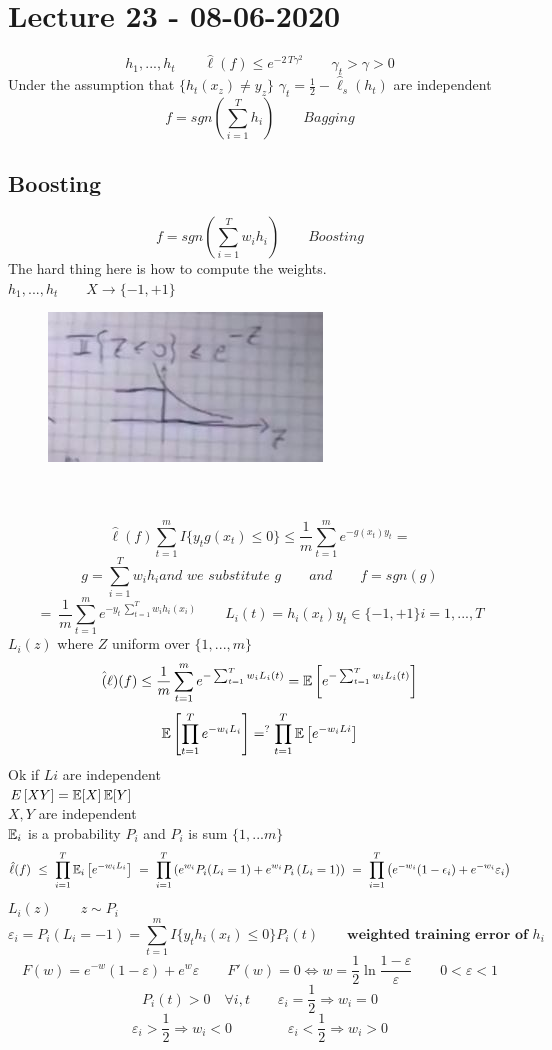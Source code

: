 \documentclass[../main.tex]{subfiles}
\begin{document}
\chapter{Lecture 23 - 08-06-2020}
$$
h_1,...,h_t \qquad \hat{\ell}(f) \leq e^{-2 \, T \gamma^2} \qquad \gamma_t > \gamma>0
$$
Under the assumption that $ \{ h_t(x_z) \neq y_z \} $ \qquad $ \gamma_t = \frac{1}{2} - \hat{\ell}_s(h_t)$ are independent 
$$
f = sgn ( \sum_{i=1}^T h_i) \qquad Bagging
$$
\section{Boosting}
$$
f = sgn ( \sum_{i=1}^T w_i h_i) \qquad Boosting
$$
The hard thing here is how to compute the weights.
\\
$
h_1, ..., h_t \qquad X \rightarrow \{ -1,+1 \} 
$
\begin{figure}[h]
    \centering
    \includegraphics[width=0.3\linewidth]{../img/lez23-img1.JPG}
    \caption{}
\end{figure}\\
\\
$$
\hat{\ell}(f)\sum^m_{t=1} I \{ y_t g(x_t) \leq 0 \}
\leq
\frac{1}{m} \sum_{t=1}^m e^{-g(x_t) y_t
} = $$
$$
g = \sum_{i = 1}^T w_i h_i \textit{and we substitute g} \qquad and \qquad f = sgn(g)
$$
$$
= \ \frac{1}{m} \sum^m_{t=1} e^{-y_t \, \sum_{t=1}^T w_i h_i(x_i)} \qquad L_i(t) = h_i (x_t) y_t \in \{-1,+1 \} i = 1, ..., T
$$
$
L_i(z) 
$ where $Z$ uniform over $\{1,...,m\}$
$$
\hat(\ell)(f) \leq \frac{1}{m} \sum_{t=1}^m e^{- \sum_{t=1}^T w_i L_i (t)} = \mathbb{E} \left[ e^{-\sum_{t=1}^T w_i L_i (t)}\right] 
$$
$$
\mathbb{E} \left[ \prod_{t=1}^T e^{- w_i L_i}\right] =^? \prod^T_{t=1} \mathbb{E} \left[ e^{-w_i Li} \right]
$$
Ok if $Li$ are independent
\\$E\left[XY \right] = \mathbb{E}[X] \, \mathbb{E} [Y]$ 
\\
$X,Y$ are independent
\\
$\mathbb{E}_i $ is a probability $P_i$ and $P_i$ is sum $\{1,...m\}$
\\
$$
\hat{\ell}(f)\ \leq \ \prod_{i=1}^T \mathbb{E}_i \left[ e^{- w_i L_i} \right]
\ = \ \prod_{i=1}^T \left( e^{w_i} P_i (L_i = 1) + e^{w_i} P_i\left(L_i=1  \right) \right) \ = \ \prod_{i=1}^T \left( e^{-w_i}(1 - \epsilon_i) + e^{-w_i} \varepsilon_i \right)$$
$ L_i(z) \qquad z \sim P_i$
$$
\varepsilon_i = P_i(L_i = -1) = \sum_{t=1}^m I \{y_t h_i(x_t) \leq 0 \} P_i(t) \qquad \textbf{weighted training error of $h_i$}
$$
$$
F(w) = e^{-w} (1- \varepsilon) + e^w \varepsilon \qquad F'(w) = 0 \Leftrightarrow w = \frac{1}{2} \ln \frac{1-\varepsilon}{\varepsilon} \qquad 0< \varepsilon< 1
$$
$$
P_i(t) > 0 \quad \forall i,t \qquad \varepsilon_i = \frac{1}{2} \Rightarrow w_i = 0
$$
$$
\varepsilon_i >\frac{1}{2} \Rightarrow w_i < 0 \qquad \qquad
\varepsilon_i < \frac{1}{2} \Rightarrow w_i > 0
$$
\end{document}
